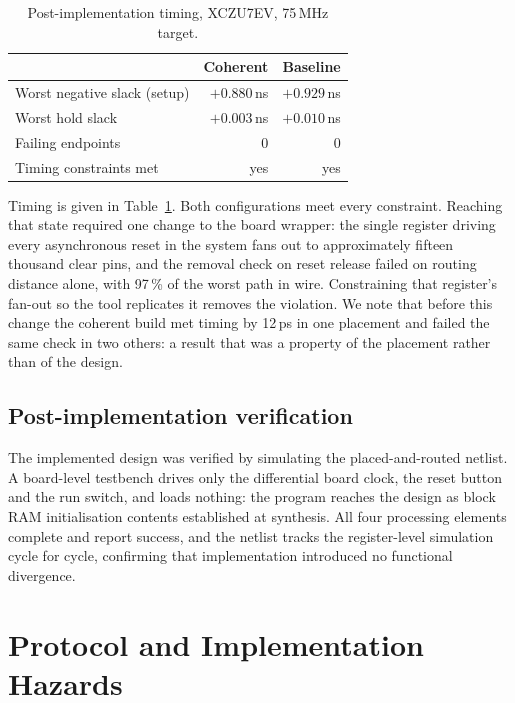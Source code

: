 \documentclass[conference]{IEEEtran}
\begin{document}
\begin{table}[t]
\caption{Post-implementation timing, XCZU7EV, 75\,MHz target.}
\label{tab:timing}
\centering
\begin{tabular}{@{}lrr@{}}
\toprule
 & Coherent & Baseline \\
\midrule
Worst negative slack (setup) & $+0.880$\,ns & $+0.929$\,ns \\
Worst hold slack             & $+0.003$\,ns & $+0.010$\,ns \\
Failing endpoints            & 0 & 0 \\
Timing constraints met       & yes & yes \\
\bottomrule
\end{tabular}
\end{table}

Timing is given in Table~\ref{tab:timing}. Both configurations meet every
constraint. Reaching that state required one change to the board wrapper: the
single register driving every asynchronous reset in the system fans out to
approximately fifteen thousand clear pins, and the removal check on reset
release failed on routing distance alone, with 97\,\% of the worst path in wire.
Constraining that register's fan-out so the tool replicates it removes the
violation. We note that before this change the coherent build met timing by
12\,ps in one placement and failed the same check in two others: a result that
was a property of the placement rather than of the design.

\subsection{Post-implementation verification}

The implemented design was verified by simulating the placed-and-routed netlist.
A board-level testbench drives only the differential board clock, the reset
button and the run switch, and loads nothing: the program reaches the design as
block RAM initialisation contents established at synthesis. All four processing
elements complete and report success, and the netlist tracks the register-level
simulation cycle for cycle, confirming that implementation introduced no
functional divergence.

\section{Protocol and Implementation Hazards}
\label{sec:bugs}
\end{document}
